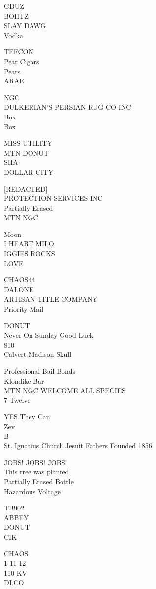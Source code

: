 \documentclass[10pt,letterpaper]{article}
\begin{document}
GDUZ\\
BOHTZ\\
SLAY DAWG\\
Vodka

TEFCON\\
Pear Cigars\\
Pears\\
ARAE

NGC\\
DULKERIAN'S PERSIAN RUG CO INC\\
Box\\
Box

MISS UTILITY\\
MTN DONUT\\
SHA\\
DOLLAR CITY

{[}REDACTED{]}\\
PROTECTION SERVICES INC\\
Partially Erased\\
MTN NGC

Moon\\
I HEART MILO\\
IGGIES ROCKS\\
LOVE

CHAOS44\\
DALONE\\
ARTISAN TITLE COMPANY\\
Priority Mail

DONUT\\
Never On Sunday Good Luck\\
810\\
Calvert Madison Skull

Professional Bail Bonds\\
Klondike Bar\\
MTN NGC WELCOME ALL SPECIES\\
7 Twelve

YES They Can\\
Zev\\
B\\
St. Ignatius Church Jesuit Fathers Founded 1856

JOBS! JOBS! JOBS!\\
This tree was planted\\
Partially Erased Bottle\\
Hazardous Voltage

TB902\\
ABBEY\\
DONUT\\
CIK

CHAOS\\
1{-}11{-}12\\
110 KV\\
DLCO
\end{document}

